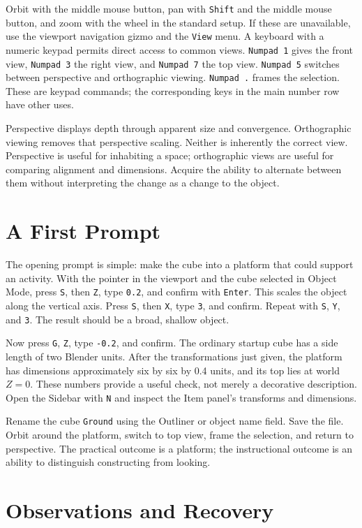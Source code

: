 \documentclass[11pt,openany]{book}
\newcommand{\key}[1]{\texttt{#1}}
\newcommand{\obj}[1]{\texttt{#1}}
\begin{document}
Orbit with the middle mouse button, pan with \key{Shift} and the middle mouse button, and zoom with the wheel in the standard setup. If these are unavailable, use the viewport navigation gizmo and the \texttt{View} menu. A keyboard with a numeric keypad permits direct access to common views. \key{Numpad 1} gives the front view, \key{Numpad 3} the right view, and \key{Numpad 7} the top view. \key{Numpad 5} switches between perspective and orthographic viewing. \key{Numpad .} frames the selection. These are keypad commands; the corresponding keys in the main number row have other uses.

Perspective displays depth through apparent size and convergence. Orthographic viewing removes that perspective scaling. Neither is inherently the correct view. Perspective is useful for inhabiting a space; orthographic views are useful for comparing alignment and dimensions. Acquire the ability to alternate between them without interpreting the change as a change to the object.

\section{A First Prompt}

The opening prompt is simple: make the cube into a platform that could support an activity. With the pointer in the viewport and the cube selected in Object Mode, press \key{S}, then \key{Z}, type \texttt{0.2}, and confirm with \key{Enter}. This scales the object along the vertical axis. Press \key{S}, then \key{X}, type \texttt{3}, and confirm. Repeat with \key{S}, \key{Y}, and \texttt{3}. The result should be a broad, shallow object.

Now press \key{G}, \key{Z}, type \texttt{-0.2}, and confirm. The ordinary startup cube has a side length of two Blender units. After the transformations just given, the platform has dimensions approximately six by six by 0.4 units, and its top lies at world $Z=0$. These numbers provide a useful check, not merely a decorative description. Open the Sidebar with \key{N} and inspect the Item panel's transforms and dimensions.

Rename the cube \obj{Ground} using the Outliner or object name field. Save the file. Orbit around the platform, switch to top view, frame the selection, and return to perspective. The practical outcome is a platform; the instructional outcome is an ability to distinguish constructing from looking.

\section{Observations and Recovery}
\end{document}
